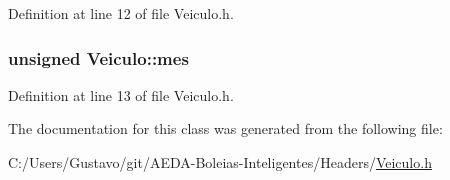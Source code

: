 Definition at line 12 of file Veiculo.\+h.

\hypertarget{class_veiculo_ac4146f7b3d38e31e3225074e0fb0dea9}{
\subsubsection[{mes}]{\setlength{\rightskip}{0pt plus 5cm}unsigned Veiculo\+::mes\hspace{0.3cm}{\ttfamily [private]}}}\label{class_veiculo_ac4146f7b3d38e31e3225074e0fb0dea9}


Definition at line 13 of file Veiculo.\+h.



The documentation for this class was generated from the following file\+:\begin{DoxyCompactItemize}
\item 
C\+:/\+Users/\+Gustavo/git/\+A\+E\+D\+A-\/\+Boleias-\/\+Inteligentes/\+Headers/\hyperlink{_veiculo_8h}{Veiculo.\+h}\end{DoxyCompactItemize}
